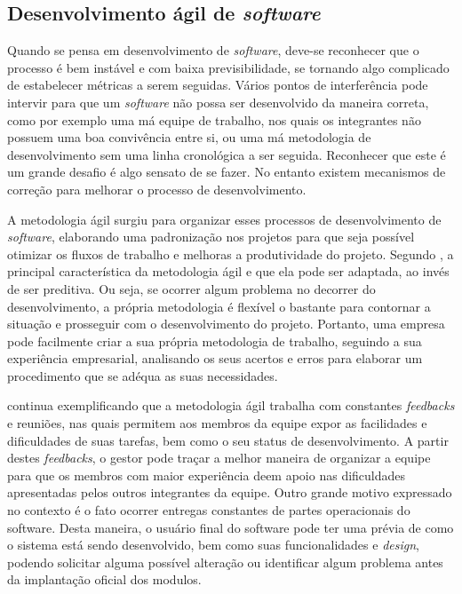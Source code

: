 \subsection{{Desenvolvimento ágil de \textit{software}}}

Quando se pensa em desenvolvimento de \textit{software}, deve-se reconhecer que o processo é bem instável e com baixa previsibilidade, se tornando algo complicado de estabelecer métricas a serem seguidas. Vários pontos de interferência pode intervir para que um \textit{software} não possa ser desenvolvido da maneira correta, como por exemplo uma má equipe de trabalho, nos quais os integrantes não possuem uma boa convivência entre si, ou uma má metodologia de desenvolvimento sem uma linha cronológica a ser seguida. Reconhecer que este é um grande desafio é algo sensato de se fazer. No entanto existem mecanismos de correção para melhorar o processo de desenvolvimento.

A metodologia ágil surgiu para organizar esses processos de desenvolvimento de \textit{software}, elaborando uma padronização nos projetos para que seja possível otimizar os fluxos de trabalho e melhoras a produtividade do projeto. Segundo , a principal característica da metodologia ágil e que ela pode ser adaptada, ao invés de ser preditiva. Ou seja, se ocorrer algum problema no decorrer do desenvolvimento, a própria metodologia é flexível o bastante para contornar a situação e prosseguir com o desenvolvimento do projeto. Portanto, uma empresa pode facilmente criar a sua própria metodologia de trabalho, seguindo a sua experiência empresarial, analisando os seus acertos e erros para elaborar um procedimento que se adéqua as suas necessidades. 

 continua exemplificando que a metodologia ágil trabalha com constantes \textit{feedbacks} e reuniões, nas quais permitem aos membros da equipe expor as facilidades e dificuldades de suas tarefas, bem como o seu status de desenvolvimento. A partir destes \textit{feedbacks}, o gestor pode traçar a melhor maneira de organizar a equipe para que os membros com maior experiência deem apoio nas dificuldades apresentadas pelos outros integrantes da equipe. Outro grande motivo expressado no contexto é o fato ocorrer entregas constantes de partes operacionais do software. Desta maneira, o usuário final do software pode ter uma prévia de como o sistema está sendo desenvolvido, bem como suas funcionalidades e \textit{design}, podendo solicitar alguma possível alteração ou identificar algum problema antes da implantação oficial dos modulos.



